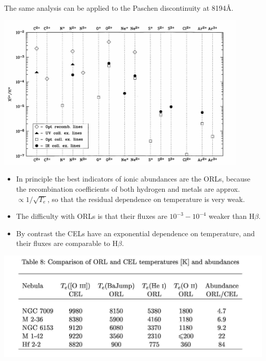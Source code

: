 The same analysis can be applied to the Paschen discontinuity at
8194\AA.


\begin{center}
      \includegraphics[width=0.9\textwidth,height=!]{./C/ORL_CEL_general.jpg}
\end{center}



\begin{itemize}
\item In principle the best indicators of ionic abundances are the
ORLs, because the recombination coefficients of both hydrogen and
metals are approx. $\propto 1/\sqrt{T_e}$, so that the residual
dependence on temperature is very weak.

\item The difficulty with  ORLs is that their fluxes are  $10^{-3} -
10^{-4}$ weaker than H$\beta$.

\item By contrast the CELs have an exponential dependence on
temperature, and their fluxes are comparable to H$\beta$.

\end{itemize}


\begin{center}
      \includegraphics[width=\textwidth,height=!]{./C/orl_cel_table.jpg}
\end{center}

